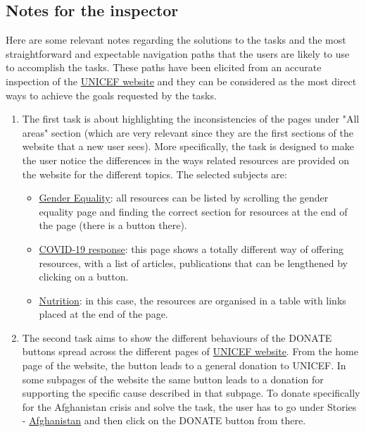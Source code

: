 \documentclass[11pt]{article}
\begin{document}
	\subsection*{Notes for the inspector}
	Here are some relevant notes regarding the solutions to the tasks and the most straightforward and expectable navigation paths that the users are likely to use to accomplish the tasks. These paths have been elicited from an accurate inspection of the \href{https://www.unicef.org/}{UNICEF website} and they can be considered as the most direct ways to achieve the goals requested by the tasks.
	\begin{enumerate}
		\item The first task is about highlighting the inconsistencies of the pages under "All areas" section (which are very relevant since they are the first sections of the website that a new user sees). 
		More specifically, the task is designed to make the user notice the differences in the ways related resources are provided on the website for the different topics. The selected subjects are:
		\begin{itemize}
			\item \href{https://www.unicef.org/gender-equality}{Gender Equality}: all resources can be listed by scrolling the gender equality page and finding the correct section for resources at the end of the page (there is a button there).
			\item \href{https://www.unicef.org/coronavirus/covid-19}{COVID-19 response}: this page shows a totally different way of offering resources, with a list of articles, publications that can be lengthened by clicking on a button.
			\item \href{https://www.unicef.org/nutrition}{Nutrition}: in this case, the resources are organised in a table with links placed at the end of the page.
		\end{itemize}
		\item The second task aims to show the different behaviours of the DONATE buttons spread across the different pages of \href{https://www.unicef.org/}{UNICEF website}. From the home page of the website, the button leads to a general donation to UNICEF. In some subpages of the website the same button leads to a donation for supporting the specific cause described in that subpage. To donate specifically for the Afghanistan crisis and solve the task, the user has to go under Stories - \href{https://www.unicef.org/emergencies/delivering-support-afghanistans-children}{Afghanistan} and then click on the DONATE button from there.

\end{enumerate}
\end{document}
